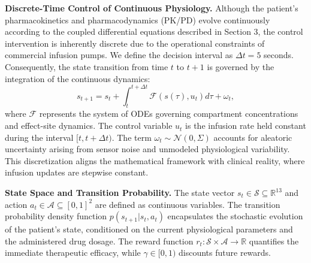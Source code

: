\documentclass[pdflatex,sn-mathphys-num]{sn-jnl}%
\newcommand{\BfPara}[1]{{\noindent\bf#1.}\xspace}
\theoremstyle{thmstyleone}%
\theoremstyle{thmstyletwo}%
\theoremstyle{thmstylethree}%
\begin{document}
\BfPara{Discrete-Time Control of Continuous Physiology}
Although the patient's pharmacokinetics and pharmacodynamics (PK/PD) evolve continuously according to the coupled differential equations described in Section 3, the control intervention is inherently discrete due to the operational constraints of commercial infusion pumps. We define the decision interval as $\Delta t = 5$ seconds. Consequently, the state transition from time $t$ to $t+1$ is governed by the integration of the continuous dynamics:
\begin{equation}
    s_{t+1} = s_t + \int_{t}^{t+\Delta t} \mathcal{F}(s(\tau), u_t) d\tau + \omega_t,
\end{equation}
where $\mathcal{F}$ represents the system of ODEs governing compartment concentrations and effect-site dynamics. The control variable $u_t$ is the infusion rate held constant during the interval $[t, t+\Delta t)$. The term $\omega_t \sim \mathcal{N}(0, \Sigma)$ accounts for aleatoric uncertainty arising from sensor noise and unmodeled physiological variability. This discretization aligns the mathematical framework with clinical reality, where infusion updates are stepwise constant.

\BfPara{State Space and Transition Probability}
The state vector $s_t \in \mathcal{S} \subseteq \mathbb{R}^{13}$ and action $a_t \in \mathcal{A} \subseteq [0, 1]^2$ are defined as continuous variables. The transition probability density function $p(s_{t+1}|s_t, a_t)$ encapsulates the stochastic evolution of the patient's state, conditioned on the current physiological parameters and the administered drug dosage. The reward function $r_t: \mathcal{S} \times \mathcal{A} \rightarrow \mathbb{R}$ quantifies the immediate therapeutic efficacy, while $\gamma \in [0, 1)$ discounts future rewards.
\end{document}
